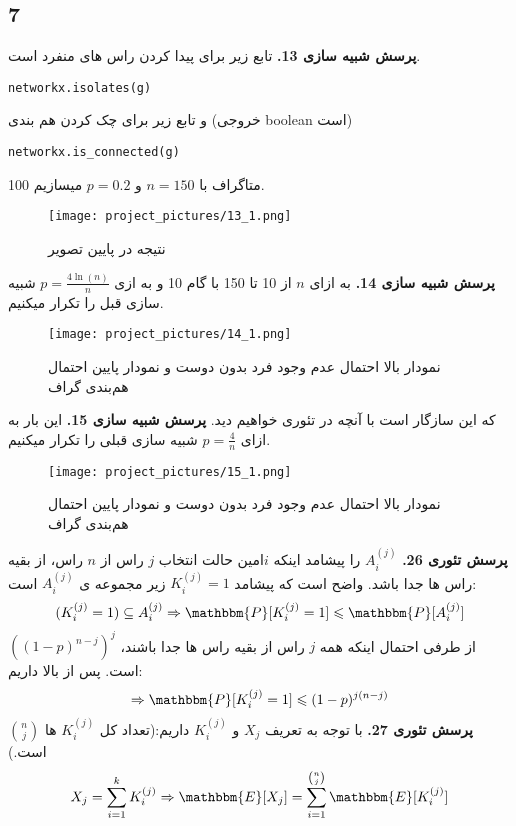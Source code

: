 \documentclass[11pt]{article}
\begin{document}
\begin{persian}
\section*{7}
\textbf{پرسش شبیه سازی 13.}
تابع زیر برای پیدا کردن راس های منفرد است.
\begin{latin}
\lstset{language=python}
\begin{lstlisting}
networkx.isolates(g)
\end{lstlisting}
\end{latin}
و تابع زیر برای چک کردن هم بندی (خروجی boolean است)
\begin{latin}
\lstset{language=python}
\begin{lstlisting}
networkx.is_connected(g)
\end{lstlisting}
\end{latin}
100 متاگراف با 
$n = 150$
و
$p = 0.2$
میسازیم.
\begin{figure}[H]
\centerline{\texttt{[image: project\_pictures/13\_1.png]}}
\caption{نتیجه در پایین تصویر }
\end{figure}
\textbf{پرسش شبیه سازی 14.}
به ازای $n$ از 10 تا 150 با گام 10 و به ازی 
$p = \frac{4\ln(n)}{n}$
شبیه سازی قبل را تکرار میکنیم.
\begin{figure}[H]
\centerline{\texttt{[image: project\_pictures/14\_1.png]}}
\caption{ نمودار بالا احتمال عدم وجود فرد بدون دوست و نمودار پایین احتمال هم‌بندی گراف}
\end{figure}
که این سازگار است با آنچه در تئوری خواهیم دید.
\newline
\textbf{پرسش شبیه سازی 15.}
این بار به ازای 
$p = \frac{4}{n}$
شبیه سازی قبلی را تکرار میکنیم.
\begin{figure}[H]
\centerline{\texttt{[image: project\_pictures/15\_1.png]}}
\caption{ نمودار بالا احتمال عدم وجود فرد بدون دوست و نمودار پایین احتمال هم‌بندی گراف}
\end{figure}
\textbf{پرسش تئوری 26.}
$A_i^{(j)}$
  را پیشامد اینکه $i$امین حالت انتخاب $j$ راس از $n$ راس، از بقیه راس ها جدا باشد. واضح است که پیشامد 
$K_i^{(j)} = 1$
زیر مجموعه ی 
$A_i^{(j)}$
است:
$$
 (K_i^{(j)} = 1 ) \subseteq A_i^{(j)} \Rightarrow \mathbbm{P}[K_i^{(j)} = 1] \leqslant \mathbbm{P}[A_i^{(j)}] 
$$
از طرفی احتمال اینکه همه $j$ راس از بقیه راس ها جدا باشند، 
$((1-p)^{n-j})^j$
است. پس از بالا داریم:
$$
\Rightarrow \mathbbm{P}[K_i^{(j)} = 1] \leqslant (1-p)^{j(n-j)}
$$
\textbf{پرسش تئوری 27.}
با توجه به تعریف $X_j$ و 
$K_i^{(j)}$
داریم:(تعداد کل 
$K_i^{(j)}$
ها 
${n \choose j}$
است.)
$$
X_j = \sum_{i=1}^{k} K_i^{(j)} \Rightarrow \mathbbm{E}[X_j ] = \sum_{i=1}^{{n \choose j}} \mathbbm{E}[K_i^{(j)}] 
$$
\end{persian}
\end{document}

